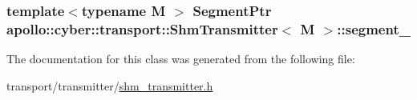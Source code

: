 \hypertarget{classapollo_1_1cyber_1_1transport_1_1ShmTransmitter_a527f62b8c1680536bee1ca9b77606a09}{
\subsubsection[{segment\-\_\-}]{\setlength{\rightskip}{0pt plus 5cm}template$<$typename M $>$ {\bf Segment\-Ptr} {\bf apollo\-::cyber\-::transport\-::\-Shm\-Transmitter}$<$ M $>$\-::segment\-\_\-\hspace{0.3cm}{\ttfamily [private]}}}\label{classapollo_1_1cyber_1_1transport_1_1ShmTransmitter_a527f62b8c1680536bee1ca9b77606a09}


The documentation for this class was generated from the following file\-:\begin{DoxyCompactItemize}
\item 
transport/transmitter/\hyperlink{shm__transmitter_8h}{shm\-\_\-transmitter.\-h}\end{DoxyCompactItemize}
